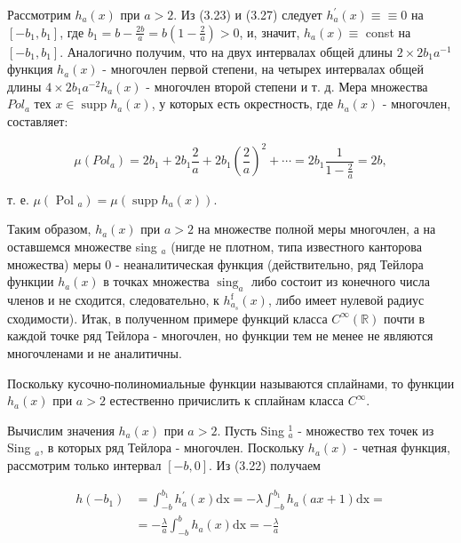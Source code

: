 \documentclass[10pt]{article}
\begin{document}
Рассмотрим $h_{a}(x)$ при $a>2$. Из (3.23) и (3.27) следует $h_{a}^{\prime}(x) \equiv \equiv 0$ на $\left[-b_{1}, b_{1}\right]$, где $b_{1}=b-\frac{2 b}{a}=b\left(1-\frac{2}{a}\right)>0$, и, значит, $h_{a}(x) \equiv$ const на $\left[-b_{1}, b_{1}\right]$. Аналогично получим, что на двух интервалах общей длины $2 \times 2 b_{1} a^{-1}$ функция $h_{a}(x)$ - многочлен первой степени, на четырех интервалах общей длины $4 \times 2 b_{1} a^{-2} h_{a}(x)$ - многочлен второй степени и т. д. Мера множества $P o l_{a}$ тех $x \in \operatorname{supp} h_{a}(x)$, у которых есть окрестность, где $h_{a}(x)$ - многочлен, составляет:


\begin{equation*}
\mu\left(P o l_{a}\right)=2 b_{1}+2 b_{1} \frac{2}{a}+2 b_{1}\left(\frac{2}{a}\right)^{2}+\cdots=2 b_{1} \frac{1}{1-\frac{2}{a}}=2 b, \tag{3.39}
\end{equation*}


т. е. $\mu\left(\right.$ Pol $\left._{a}\right)=\mu\left(\operatorname{supp} h_{a}(x)\right)$.

Таким образом, $h_{a}(x)$ при $a>2$ на множестве полной меры многочлен, а на оставшемся множестве sing ${ }_{a}$ (нигде не плотном, типа известного канторова множества) меры 0 - неаналитическая функция (действительно, ряд Тейлора функции $h_{a}(x)$ в точках множества $\operatorname{sing}_{a}$ либо состоит из конечного числа членов и не сходится, следовательно, к $h_{a_{s}}^{\mathrm{f}}(x)$, либо имеет нулевой радиус сходимости). Итак, в полученном примере функций класса $C^{\infty}(\mathbb{R})$ почти в каждой точке ряд Тейлора - многочлен, но функции тем не менее не являются многочленами и не аналитичны.

Поскольку кусочно-полиномиальные функции называются сплайнами, то функции $h_{a}(x)$ при $a>2$ естественно причислить к сплайнам класса $C^{\infty}$.

Вычислим значения $h_{a}(x)$ при $a>2$. Пусть Sing ${ }_{a}^{1}$ - множество тех точек из Sing ${ }_{a}$, в которых ряд Тейлора - многочлен. Поскольку $h_{a}(x)$ - четная функция, рассмотрим только интервал $[-b, 0]$. Из (3.22) получаем

$$
\begin{aligned}
h\left(-b_{1}\right) & =\int_{-b}^{b_{1}} h_{a}^{\prime}(x) \mathrm{dx}=-\lambda \int_{-b}^{b_{1}} h_{a}(a x+1) \mathrm{dx}= \\
& =-\frac{\lambda}{a} \int_{-b}^{b} h_{a}(x) \mathrm{dx}=-\frac{\lambda}{a}
\end{aligned}
$$
\end{document}
